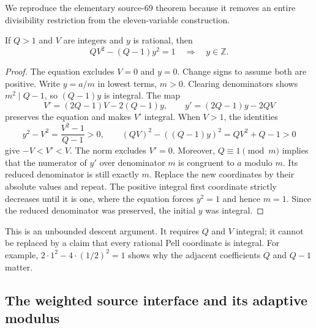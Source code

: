 We reproduce the elementary source-69 theorem because it removes an
entire divisibility restriction from the eleven-variable construction.

\begin{lemma}
\label{pp:saturation}
If $Q>1$ and $V$ are integers and $y$ is rational, then
\[
 QV^2-(Q-1)y^2=1\quad\Longrightarrow\quad y\in\mathbb Z.
\]
\end{lemma}
\begin{proof}
The equation excludes $V=0$ and $y=0$. Change signs to assume both are
positive. Write $y=a/m$ in lowest terms, $m>0$. Clearing denominators
shows $m^2\mid Q-1$, so $(Q-1)y$ is integral. The map
\[
 V'=(2Q-1)V-2(Q-1)y,\qquad y'=(2Q-1)y-2QV
\]
preserves the equation and makes $V'$ integral. When $V>1$, the identities
\[
 y^2-V^2=\frac{V^2-1}{Q-1}>0,
 \qquad (QV)^2-((Q-1)y)^2=QV^2+Q-1>0
\]
give $-V<V'<V$. The norm excludes $V'=0$. Moreover, $Q\equiv1\pmod m$
implies that the numerator of $y'$ over denominator $m$ is congruent to
$a$ modulo $m$. Its reduced denominator is still exactly $m$.
Replace the new coordinates by their absolute values and repeat. The
positive integral first coordinate strictly decreases until it is one,
where the equation forces $y^2=1$ and hence $m=1$. Since the reduced
denominator was preserved, the initial $y$ was integral.
\end{proof}

This is an unbounded descent argument. It requires $Q$ and $V$ integral;
it cannot be replaced by a claim that every rational Pell coordinate is
integral. For example, $2\cdot1^2-4\cdot(1/2)^2=1$ shows why the adjacent
coefficients $Q$ and $Q-1$ matter.

\subsection{The weighted source interface and its adaptive modulus}


